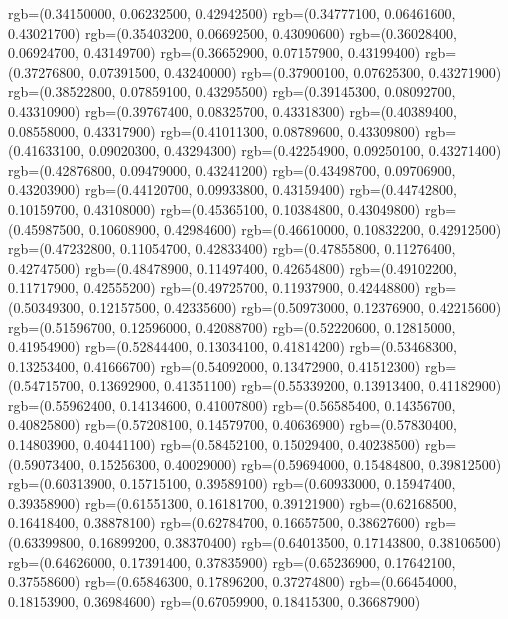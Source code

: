 {{        rgb=(0.34150000, 0.06232500, 0.42942500)
        rgb=(0.34777100, 0.06461600, 0.43021700)
        rgb=(0.35403200, 0.06692500, 0.43090600)
        rgb=(0.36028400, 0.06924700, 0.43149700)
        rgb=(0.36652900, 0.07157900, 0.43199400)
        rgb=(0.37276800, 0.07391500, 0.43240000)
        rgb=(0.37900100, 0.07625300, 0.43271900)
        rgb=(0.38522800, 0.07859100, 0.43295500)
        rgb=(0.39145300, 0.08092700, 0.43310900)
        rgb=(0.39767400, 0.08325700, 0.43318300)
        rgb=(0.40389400, 0.08558000, 0.43317900)
        rgb=(0.41011300, 0.08789600, 0.43309800)
        rgb=(0.41633100, 0.09020300, 0.43294300)
        rgb=(0.42254900, 0.09250100, 0.43271400)
        rgb=(0.42876800, 0.09479000, 0.43241200)
        rgb=(0.43498700, 0.09706900, 0.43203900)
        rgb=(0.44120700, 0.09933800, 0.43159400)
        rgb=(0.44742800, 0.10159700, 0.43108000)
        rgb=(0.45365100, 0.10384800, 0.43049800)
        rgb=(0.45987500, 0.10608900, 0.42984600)
        rgb=(0.46610000, 0.10832200, 0.42912500)
        rgb=(0.47232800, 0.11054700, 0.42833400)
        rgb=(0.47855800, 0.11276400, 0.42747500)
        rgb=(0.48478900, 0.11497400, 0.42654800)
        rgb=(0.49102200, 0.11717900, 0.42555200)
        rgb=(0.49725700, 0.11937900, 0.42448800)
        rgb=(0.50349300, 0.12157500, 0.42335600)
        rgb=(0.50973000, 0.12376900, 0.42215600)
        rgb=(0.51596700, 0.12596000, 0.42088700)
        rgb=(0.52220600, 0.12815000, 0.41954900)
        rgb=(0.52844400, 0.13034100, 0.41814200)
        rgb=(0.53468300, 0.13253400, 0.41666700)
        rgb=(0.54092000, 0.13472900, 0.41512300)
        rgb=(0.54715700, 0.13692900, 0.41351100)
        rgb=(0.55339200, 0.13913400, 0.41182900)
        rgb=(0.55962400, 0.14134600, 0.41007800)
        rgb=(0.56585400, 0.14356700, 0.40825800)
        rgb=(0.57208100, 0.14579700, 0.40636900)
        rgb=(0.57830400, 0.14803900, 0.40441100)
        rgb=(0.58452100, 0.15029400, 0.40238500)
        rgb=(0.59073400, 0.15256300, 0.40029000)
        rgb=(0.59694000, 0.15484800, 0.39812500)
        rgb=(0.60313900, 0.15715100, 0.39589100)
        rgb=(0.60933000, 0.15947400, 0.39358900)
        rgb=(0.61551300, 0.16181700, 0.39121900)
        rgb=(0.62168500, 0.16418400, 0.38878100)
        rgb=(0.62784700, 0.16657500, 0.38627600)
        rgb=(0.63399800, 0.16899200, 0.38370400)
        rgb=(0.64013500, 0.17143800, 0.38106500)
        rgb=(0.64626000, 0.17391400, 0.37835900)
        rgb=(0.65236900, 0.17642100, 0.37558600)
        rgb=(0.65846300, 0.17896200, 0.37274800)
        rgb=(0.66454000, 0.18153900, 0.36984600)
        rgb=(0.67059900, 0.18415300, 0.36687900)
}}
